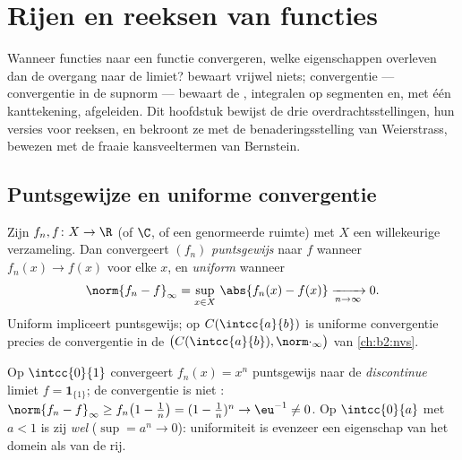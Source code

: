 \chapter{Rijen en reeksen van functies}\label{ch:b2:funcseq}

Wanneer functies naar een functie convergeren, welke eigenschappen
overleven dan de overgang naar de limiet? 
bewaart vrijwel niets; \emph{} convergentie --- convergentie
in de supnorm --- bewaart de , integralen op segmenten
en, met één kanttekening, afgeleiden. Dit hoofdstuk bewijst de drie
overdrachtsstellingen, hun versies voor reeksen, en bekroont ze met
de benaderingsstelling van Weierstrass, bewezen met de fraaie
kansveeltermen van Bernstein.

\section{Puntsgewijze en uniforme convergentie}

\begin{definition}\label{def:b2:funcseq:def}
Zijn $f_n, f \colon X \to \R$ (of $\C$, of een genormeerde ruimte)
met $X$ een willekeurige verzameling. Dan convergeert $(f_n)$
\emph{puntsgewijs} naar $f$
wanneer $f_n(x) \to f(x)$ voor elke $x$, en
\emph{uniform} wanneer
\[
\norm{f_n - f}_\infty = \sup_{x \in X}\, \abs{f_n(x) - f(x)}
\xrightarrow[n \to \infty]{} 0 .
\]
Uniform impliceert puntsgewijs; op $C(\intcc{a}{b})$ is uniforme
convergentie precies de convergentie in de 
$\bigl(C(\intcc{a}{b}), \norm\cdot_\infty\bigr)$ van
\cref{ch:b2:nvs}.
\end{definition}

\begin{example}\label{ex:b2:funcseq:xn}
Op $\intcc{0}{1}$ convergeert $f_n(x) = x^n$ puntsgewijs naar de
\emph{discontinue} limiet $f = \mathbf{1}_{\{1\}}$; de convergentie
is niet : $\norm{f_n - f}_\infty \geq f_n\bigl(1 -
\tfrac1n\bigr) = (1 - \tfrac1n)^n \to \eu^{-1} \neq 0$. Op
$\intcc{0}{a}$ met $a < 1$ is zij \emph{wel}  ($\sup = a^n
\to 0$): uniformiteit is evenzeer een eigenschap van het domein als
van de rij.
\end{example}

